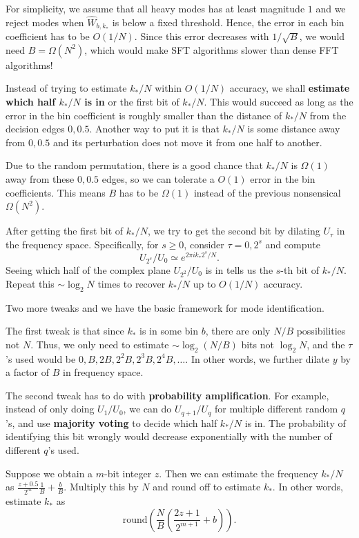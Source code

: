 \documentclass[10pt]{article}
\begin{document}
For simplicity, we assume that all heavy modes has at least magnitude $1$ and we reject modes when $\hat{W}_{b,k_*}$ is below a fixed threshold. Hence, the error in each bin coefficient has to be $O(1/N)$. Since this error decreases with $1/\sqrt{B}$, we would need $B=\Omega(N^2)$, which would make SFT algorithms slower than dense FFT algorithms!

Instead of trying to estimate $k_*/N$ within $O(1/N)$ accuracy, we shall \textbf{estimate which half $k_*/N$ is in} or the first bit of $k_*/N$. This would succeed as long as the error in the bin coefficient is roughly smaller than the distance of $k_*/N$ from the decision edges $0, 0.5$. Another way to put it is that $k_*/N$ is some distance away from $0, 0.5$ and its perturbation does not move it from one half to another.

Due to the random permutation, there is a good chance that $k_*/N$ is $\Omega(1)$ away from these $0,0.5$ edges, so we can tolerate a $O(1)$ error in the bin coefficients. This means $B$ has to be $\Omega(1)$ instead of the previous nonsensical $\Omega(N^2)$.

After getting the first bit of $k_*/N$, we try to get the second bit by dilating $U_{\tau}$ in the frequency space. Specifically, for $s\geq 0$, consider $\tau=0,2^s$ and compute
$$U_{2^s}/U_0 \simeq e^{2\pi i k_* 2^s/N}.$$
Seeing which half of the complex plane $U_{2^2}/U_0$ is in tells us the $s$-th bit of $k_*/N$. Repeat this $\sim \log_2 N$ times to recover $k_*/N$ up to $O(1/N)$ accuracy.

Two more tweaks and we have the basic framework for mode identification.

The first tweak is that since $k_*$ is in some bin $b$, there are only $N/B$ possibilities not $N$. Thus, we only need to estimate $\sim \log_2 (N/B)$ bits not $\log_2 N$, and the $\tau$'s used would be $0, B, 2B, 2^2 B, 2^3 B, 2^4 B, \ldots$. In other words, we further dilate $y$ by a factor of $B$ in frequency space.

The second tweak has to do with \textbf{probability amplification}. For example, instead of only doing $U_{1}/U_0$, we can do $U_{q+1}/U_q$ for multiple different random $q$'s, and use \textbf{majority voting} to decide which half $k_*/N$ is in. The probability of identifying this bit wrongly would decrease exponentially with the number of different $q$'s used.

Suppose we obtain a $m$-bit integer $z$. Then we can estimate the frequency $k_*/N$ as $\frac{z+0.5}{2^m} \frac{1}{B} + \frac{b}{B}$. Multiply this by $N$ and round off to estimate $k_*$. In other words, estimate $k_*$ as
$$\text{round}\left( \frac{N}{B} \left( \frac{2z+1}{2^{m+1}} + b\right)\right).$$
\end{document}
